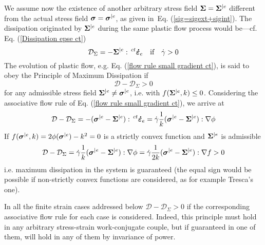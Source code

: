\documentclass[preprint,review,12pt,sort&compress]{elsarticle}%
\renewcommand{\mathbf}[1]{\mbox{\boldmath $#1$ \unboldmath}  \!\!}
\begin{document}
We assume now the existence of another arbitrary stress field $\mathbf{\Sigma
}=\mathbf{\Sigma}^{|e}$ different from the actual stress field $\mathbf{\sigma
}=\mathbf{\sigma}^{|e}$, as given in\ Eq. (\ref{sig=sigext+sigint}). The
dissipation originated by $\mathbf{\Sigma}^{|e}$ during the same plastic flow
process would be---cf. Eq. (\ref{Dissipation epse ct})%
\begin{equation}
\mathcal{D}_{\Sigma}=-\mathbf{\Sigma}^{|e}:\,^{ct}\mathbf{\dot{\varepsilon}%
}_{e}\text{\quad if}\quad\dot{\gamma}>0
\end{equation}
The evolution of plastic flow, e.g. Eq. (\ref{flow rule small gradient ct}),
is said to obey the Principle of Maximum Dissipation if%
\begin{equation}
\mathcal{D}-\mathcal{D}_{\Sigma}>0
\end{equation}
for any admissible stress field $\mathbf{\Sigma}^{|e}\neq\mathbf{\sigma}^{|e}%
$, i.e. with $f(\mathbf{\Sigma}^{|e},k)\leq0$. Considering the associative
flow rule of Eq. (\ref{flow rule small gradient ct}), we arrive at%
\begin{equation}
\mathcal{D}-\mathcal{D}_{\Sigma}=-(\mathbf{\sigma}^{|e}-\mathbf{\Sigma}%
^{|e}):\,^{ct}\mathbf{\dot{\varepsilon}}_{e}=\dot{\gamma}\frac{1}%
{k}(\mathbf{\sigma}^{|e}-\mathbf{\Sigma}^{|e}):\nabla\phi
\end{equation}
If $f(\mathbf{\sigma}^{|e},k)=2\phi(\mathbf{\sigma}^{|e})-k^{2}=0$ is a
strictly convex function and $\mathbf{\Sigma}^{|e}$ is admissible%
\begin{equation}
\mathcal{D}-\mathcal{D}_{\Sigma}=\dot{\gamma}\frac{1}{k}(\mathbf{\sigma}%
^{|e}-\mathbf{\Sigma}^{|e}):\nabla\phi=\dot{\gamma}\frac{1}{2k}(\mathbf{\sigma
}^{|e}-\mathbf{\Sigma}^{|e}):\nabla f>0
\end{equation}
i.e. maximum dissipation in the system is guaranteed (the equal sign would be
possible if non-strictly convex functions are considered, as for example
Tresca's one).

In all the finite strain cases addressed below $\mathcal{D}-\mathcal{D}%
_{\Sigma}>0$ if the corresponding associative flow rule for each case is
considered. Indeed, this principle must hold in any arbitrary stress-strain
work-conjugate couple, but if guaranteed in one of them, will hold in any of
them by invariance of power.
\end{document}
